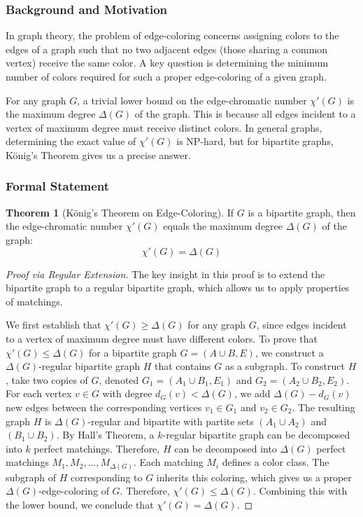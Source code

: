 \documentclass{article}
\theoremstyle{definition}
\newtheorem{theorem}{Theorem}
\begin{document}
\subsubsection{Background and Motivation}

In graph theory, the problem of edge-coloring concerns assigning colors to the edges of a graph such that no two adjacent edges (those sharing a common vertex) receive the same color. A key question is determining the minimum number of colors required for such a proper edge-coloring of a given graph.

For any graph $G$, a trivial lower bound on the edge-chromatic number $\chi'(G)$ is the maximum degree $\Delta(G)$ of the graph. This is because all edges incident to a vertex of maximum degree must receive distinct colors. In general graphs, determining the exact value of $\chi'(G)$ is NP-hard, but for bipartite graphs, König's Theorem gives us a precise answer.

\subsubsection{Formal Statement}

\begin{theorem}[König's Theorem on Edge-Coloring]
If $G$ is a bipartite graph, then the edge-chromatic number $\chi'(G)$ equals the maximum degree $\Delta(G)$ of the graph:
\begin{equation}
\chi'(G) = \Delta(G)
\end{equation}
\end{theorem}

\begin{proof}[Proof via Regular Extension]
The key insight in this proof is to extend the bipartite graph to a regular bipartite graph, which allows us to apply properties of matchings.

We first establish that $\chi'(G) \geq \Delta(G)$ for any graph $G$, since edges incident to a vertex of maximum degree must have different colors. To prove that $\chi'(G) \leq \Delta(G)$ for a bipartite graph $G = (A \cup B, E)$, we construct a $\Delta(G)$-regular bipartite graph $H$ that contains $G$ as a subgraph. To construct $H$, take two copies of $G$, denoted $G_1 = (A_1 \cup B_1, E_1)$ and $G_2 = (A_2 \cup B_2, E_2)$. For each vertex $v \in G$ with degree $d_G(v) < \Delta(G)$, we add $\Delta(G) - d_G(v)$ new edges between the corresponding vertices $v_1 \in G_1$ and $v_2 \in G_2$. The resulting graph $H$ is $\Delta(G)$-regular and bipartite with partite sets $(A_1 \cup A_2)$ and $(B_1 \cup B_2)$. By Hall's Theorem, a $k$-regular bipartite graph can be decomposed into $k$ perfect matchings. Therefore, $H$ can be decomposed into $\Delta(G)$ perfect matchings $M_1, M_2, \ldots, M_{\Delta(G)}$. Each matching $M_i$ defines a color class. The subgraph of $H$ corresponding to $G$ inherits this coloring, which gives us a proper $\Delta(G)$-edge-coloring of $G$. Therefore, $\chi'(G) \leq \Delta(G)$. Combining this with the lower bound, we conclude that $\chi'(G) = \Delta(G)$.
\end{proof}
\end{document}
